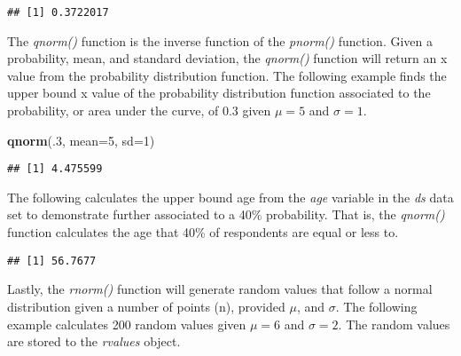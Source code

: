 \documentclass[]{article}
\newenvironment{Shaded}{\begin{snugshade}}{\end{snugshade}}
\newcommand{\KeywordTok}[1]{\textcolor[rgb]{0.13,0.29,0.53}{\textbf{#1}}}
\newcommand{\DataTypeTok}[1]{\textcolor[rgb]{0.13,0.29,0.53}{#1}}
\newcommand{\DecValTok}[1]{\textcolor[rgb]{0.00,0.00,0.81}{#1}}
\newcommand{\OperatorTok}[1]{\textcolor[rgb]{0.81,0.36,0.00}{\textbf{#1}}}
\newcommand{\NormalTok}[1]{#1}
\begin{document}
\begin{verbatim}
## [1] 0.3722017
\end{verbatim}

The \emph{qnorm()} function is the inverse function of the
\emph{pnorm()} function. Given a probability, mean, and standard
deviation, the \emph{qnorm()} function will return an x value from the
probability distribution function. The following example finds the upper
bound x value of the probability distribution function associated to the
probability, or area under the curve, of 0.3 given \(\mu = 5\) and
\(\sigma = 1\).

\begin{Shaded}
\begin{Highlighting}[]
\KeywordTok{qnorm}\NormalTok{(.}\DecValTok{3}\NormalTok{, }\DataTypeTok{mean=}\DecValTok{5}\NormalTok{, }\DataTypeTok{sd=}\DecValTok{1}\NormalTok{)}
\end{Highlighting}
\end{Shaded}

\begin{verbatim}
## [1] 4.475599
\end{verbatim}

The following calculates the upper bound age from the \emph{age}
variable in the \emph{ds} data set to demonstrate further associated to
a 40\% probability. That is, the \emph{qnorm()} function calculates the
age that 40\% of respondents are equal or less to.

\begin{Shaded}
\end{Shaded}

\begin{verbatim}
## [1] 56.7677
\end{verbatim}

Lastly, the \emph{rnorm()} function will generate random values that
follow a normal distribution given a number of points (n), provided
\(\mu\), and \(\sigma\). The following example calculates 200 random
values given \(\mu = 6\) and \(\sigma = 2\). The random values are
stored to the \emph{rvalues} object.
\end{document}
